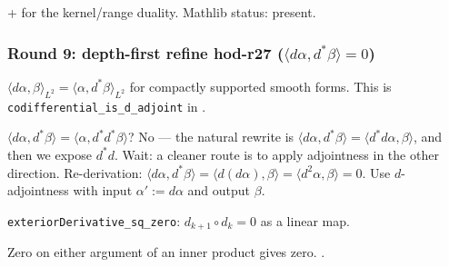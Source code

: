 \begin{lemma}
\label{lem:hod-r40}
 +  for the kernel/range duality.  Mathlib status: present.
\leanok\mathlibok
\end{lemma}

\subsubsection*{Round 9: depth-first refine hod-r27 ($\langle d\alpha,d^{*}\beta\rangle = 0$)}

\begin{lemma}
\label{lem:hod-r41}
$\langle d\alpha,\beta\rangle_{L^{2}} = \langle\alpha,d^{*}\beta\rangle_{L^{2}}$ for compactly supported smooth forms.  This is \texttt{codifferential\_is\_d\_adjoint} in .
\leanok
\end{lemma}

\begin{lemma}
\label{lem:hod-r42}
$\langle d\alpha,d^{*}\beta\rangle = \langle\alpha,d^{*}d^{*}\beta\rangle$? No --- the natural rewrite is $\langle d\alpha,d^{*}\beta\rangle = \langle d^{*}d\alpha,\beta\rangle$, and then we expose $d^{*}d$.  Wait: a cleaner route is to apply adjointness in the other direction.  Re-derivation: $\langle d\alpha, d^{*}\beta\rangle = \langle d(d\alpha), \beta\rangle = \langle d^{2}\alpha,\beta\rangle = 0$.  Use $d$-adjointness with input $\alpha' := d\alpha$ and output $\beta$.
\leanok
\end{lemma}

\begin{lemma}[Pass hod.43: $d^{2}\alpha = 0$ identically]
\label{lem:hod-r43}
\texttt{exteriorDerivative\_sq\_zero}: $d_{k+1}\circ d_{k} = 0$ as a linear map.
\leanok
\end{lemma}

\begin{lemma}[Pass hod.44: $\langle 0,\beta\rangle = 0$]
\label{lem:hod-r44}
Zero on either argument of an inner product gives zero.  .
\leanok\mathlibok
\end{lemma}

